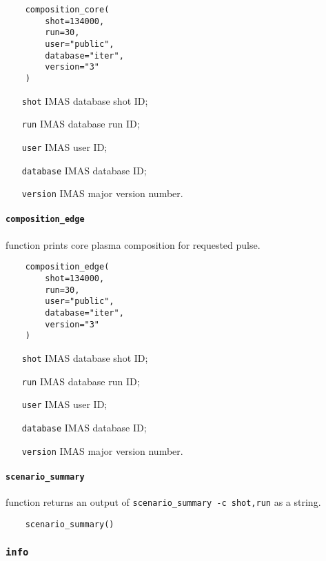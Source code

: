 \documentclass[../../main]{subfiles}
\begin{document}
\begin{verbatim}
    composition_core(
        shot=134000,
        run=30,
        user="public",
        database="iter",
        version="3"
    )
\end{verbatim}

\begin{itemize}[align=left]
    \item[\texttt{shot}] IMAS database shot ID;
    \item[\texttt{run}] IMAS database run ID;
    \item[\texttt{user}] IMAS user ID;
    \item[\texttt{database}] IMAS database ID;
    \item[\texttt{version}] IMAS major version number.
\end{itemize}

\paragraph{\texttt{composition\_edge}} function prints core plasma composition for requested pulse.

\begin{verbatim}
    composition_edge(
        shot=134000,
        run=30,
        user="public",
        database="iter",
        version="3"
    )
\end{verbatim}

\begin{itemize}[align=left]
    \item[\texttt{shot}] IMAS database shot ID;
    \item[\texttt{run}] IMAS database run ID;
    \item[\texttt{user}] IMAS user ID;
    \item[\texttt{database}] IMAS database ID;
    \item[\texttt{version}] IMAS major version number.
\end{itemize}

\paragraph{\texttt{scenario\_summary}} function returns an output of \texttt{scenario_summary -c shot,run} as a string.

\begin{verbatim}
    scenario_summary()
\end{verbatim}

\subsubsection{\texttt{info}}
\end{document}
